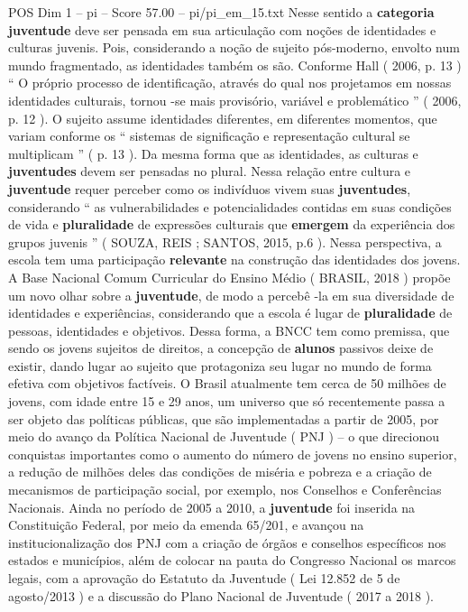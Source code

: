 \begin{textsample}{POS Dim 1 – pi – Score 57.00 – pi/pi\_em\_15.txt}
Nesse sentido a \textbf{categoria} \textbf{juventude} deve ser pensada em sua articulação com noções de identidades e culturas juvenis.
Pois, considerando a noção de sujeito pós-moderno, envolto num mundo fragmentado, as identidades também os são.
Conforme Hall ( 2006, p. 13 ) “ O próprio processo de identificação, através do qual nos projetamos em nossas identidades culturais, tornou -se mais provisório, variável e problemático ” ( 2006, p. 12 ).
O sujeito assume identidades diferentes, em diferentes momentos, que variam conforme os “ sistemas de significação e representação cultural se multiplicam ” ( p. 13 ).
Da mesma forma que as identidades, as culturas e \textbf{juventudes} devem ser pensadas no plural.
Nessa relação entre cultura e \textbf{juventude} requer perceber como os indivíduos vivem suas \textbf{juventudes}, considerando “ as vulnerabilidades e potencialidades contidas em suas condições de vida e \textbf{pluralidade} de expressões culturais que \textbf{emergem} da experiência dos grupos juvenis ” ( SOUZA, REIS ; SANTOS, 2015, p.6 ).
Nessa perspectiva, a escola tem uma participação \textbf{relevante} na construção das identidades dos jovens.
A Base Nacional Comum Curricular do Ensino Médio ( BRASIL, 2018 ) propõe um novo olhar sobre a \textbf{juventude}, de modo a percebê -la em sua diversidade de identidades e experiências, considerando que a escola é lugar de \textbf{pluralidade} de pessoas, identidades e objetivos.
Dessa forma, a BNCC tem como premissa, que sendo os jovens sujeitos de direitos, a concepção de \textbf{alunos} passivos deixe de existir, dando lugar ao sujeito que protagoniza seu lugar no mundo de forma efetiva com objetivos factíveis.
O Brasil atualmente tem cerca de 50 milhões de jovens, com idade entre 15 e 29 anos, um universo que só recentemente passa a ser objeto das políticas públicas, que são implementadas a partir de 2005, por meio do avanço da Política Nacional de Juventude ( PNJ ) – o que direcionou conquistas importantes como o aumento do número de jovens no ensino superior, a redução de milhões deles das condições de miséria e pobreza e a criação de mecanismos de participação social, por exemplo, nos Conselhos e Conferências Nacionais.
Ainda no período de 2005 a 2010, a \textbf{juventude} foi inserida na Constituição Federal, por meio da emenda 65/201, e avançou na institucionalização dos PNJ com a criação de órgãos e conselhos específicos nos estados e municípios, além de colocar na pauta do Congresso Nacional os marcos legais, com a aprovação do Estatuto da Juventude ( Lei 12.852 de 5 de agosto/2013 ) e a discussão do Plano Nacional de Juventude ( 2017 a 2018 ).

\end{textsample}
